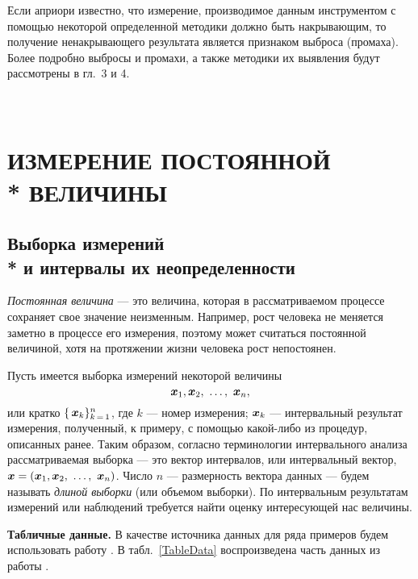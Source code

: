 \documentclass[a5paper,openany]{book}
\newcommand{\mbf}[1]{\protect\text{\boldmath$#1$}}
\begin{document}
{Если априори известно, что измерение, производимое данным инструментом с помощью
некоторой определенной методики должно быть накрывающим, то получение 
ненакрывающего результата является признаком выброса (промаха). 
Более подробно выбросы и промахи, а также методики их выявления будут 
рассмотрены  в гл.~3 и 4.

\thispagestyle{empty}

	\chapter[Измерение постоянной величины]{\\ИЗМЕРЕНИЕ ПОСТОЯННОЙ \\* ВЕЛИЧИНЫ} 
\label{MeasrConstChap}
%

\section[Выборка измерений и интервалы их неопределенности]%
{Выборка измерений \\*  и интервалы их неопределенности} 
 

\emph{Постоянная величина} --- это величина, которая в рассматриваемом 
процессе сохраняет свое значение неизменным. Например, рост человека не меняется 
заметно в процессе его измерения, поэтому может считаться постоянной величиной, 
хотя на протяжении жизни человека рост непостоянен. 

Пусть имеется выборка измерений некоторой величины
\begin{equation}
	\label{ISample} 
	\mbf{x}_{1}, \mbf{x}_{2}, \ \ldots, \ \mbf{x}_{n}, 
\end{equation}                                 
или кратко $\{\,\mbf{x}_{k}\}_{k \, = \, 1}^n$, где $k$ --- номер измерения; $\mbf{x}_k$ 
--- интервальный результат измерения, полученный, к примеру, с помощью какой-либо из процедур, 
описанных ранее. Таким образом, согласно терминологии интервального 
анализа рассматриваемая выборка --- это вектор интервалов, или интервальный вектор, 
$\mbf{x} = (\mbf{x}_{1}, \mbf{x}_{2}, \ \ldots, \ \mbf{x}_{n})$. Число $n$ --- размерность 
вектора данных --- будем называть \emph{длиной выборки} (или объемом 
выборки). По интервальным результатам измерений или наблюдений 
требуется найти оценку интересующей нас величины. 

{\bf Табличные данные.}
В качестве источника данных для ряда примеров будем использовать работу \cite{Pgamma1992}. В табл.~\ref{TableData}	воспроизведена часть данных из работы \cite{Pgamma1992}. 

}
\end{document}

